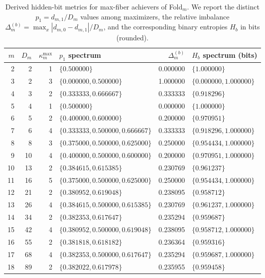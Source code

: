 \begin{table}[H]
\centering
\scriptsize
\setlength{\tabcolsep}{5pt}
\caption{Derived hidden-bit metrics for max-fiber achievers of Fold$_m$. We report the distinct $p_1=d_{m,1}/D_m$ values among maximizers, the relative imbalance $\Delta_m^{(b)}=\max_x |d_{m,0}-d_{m,1}|/D_m$, and the corresponding binary entropies $H_b$ in bits (rounded).}
\label{tab:fold_max_fiber_achievers_hiddenbit_metrics}
\begin{tabular}{r r r l r l}
\toprule
$m$ & $D_m$ & $\kappa_m^{\mathrm{max}}$ & $p_1$ spectrum & $\Delta_m^{(b)}$ & $H_b$ spectrum (bits)\\
\midrule
2 & 2 & 1 & $\{0.500000\}$ & 0.000000 & $\{1.000000\}$\\
3 & 2 & 3 & $\{0.000000, 0.500000\}$ & 1.000000 & $\{0.000000, 1.000000\}$\\
4 & 3 & 2 & $\{0.333333, 0.666667\}$ & 0.333333 & $\{0.918296\}$\\
5 & 4 & 1 & $\{0.500000\}$ & 0.000000 & $\{1.000000\}$\\
6 & 5 & 2 & $\{0.400000, 0.600000\}$ & 0.200000 & $\{0.970951\}$\\
7 & 6 & 4 & $\{0.333333, 0.500000, 0.666667\}$ & 0.333333 & $\{0.918296, 1.000000\}$\\
8 & 8 & 3 & $\{0.375000, 0.500000, 0.625000\}$ & 0.250000 & $\{0.954434, 1.000000\}$\\
9 & 10 & 4 & $\{0.400000, 0.500000, 0.600000\}$ & 0.200000 & $\{0.970951, 1.000000\}$\\
10 & 13 & 2 & $\{0.384615, 0.615385\}$ & 0.230769 & $\{0.961237\}$\\
11 & 16 & 5 & $\{0.375000, 0.500000, 0.625000\}$ & 0.250000 & $\{0.954434, 1.000000\}$\\
12 & 21 & 2 & $\{0.380952, 0.619048\}$ & 0.238095 & $\{0.958712\}$\\
13 & 26 & 4 & $\{0.384615, 0.500000, 0.615385\}$ & 0.230769 & $\{0.961237, 1.000000\}$\\
14 & 34 & 2 & $\{0.382353, 0.617647\}$ & 0.235294 & $\{0.959687\}$\\
15 & 42 & 4 & $\{0.380952, 0.500000, 0.619048\}$ & 0.238095 & $\{0.958712, 1.000000\}$\\
16 & 55 & 2 & $\{0.381818, 0.618182\}$ & 0.236364 & $\{0.959316\}$\\
17 & 68 & 4 & $\{0.382353, 0.500000, 0.617647\}$ & 0.235294 & $\{0.959687, 1.000000\}$\\
18 & 89 & 2 & $\{0.382022, 0.617978\}$ & 0.235955 & $\{0.959458\}$\\

\end{tabular}
\end{table}
